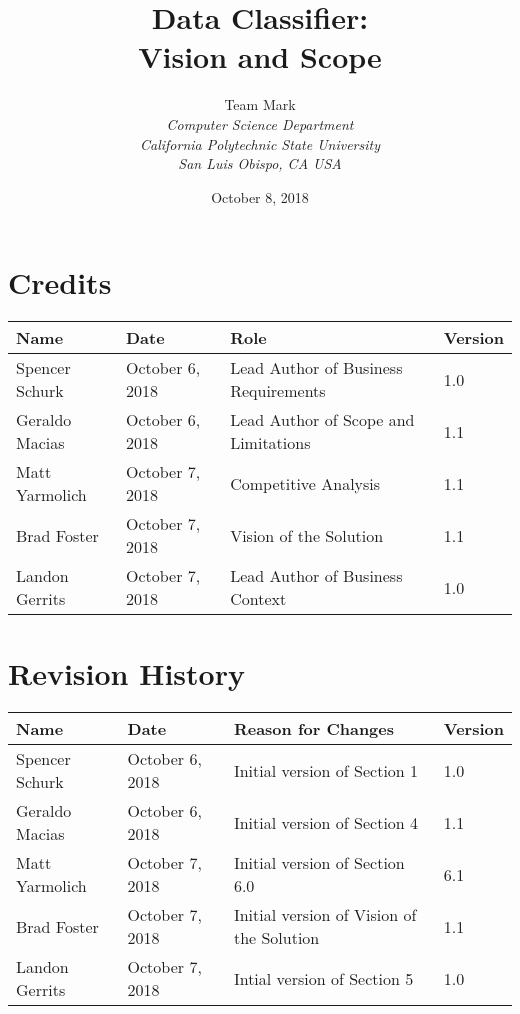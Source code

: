 \documentclass[12pt,oneside,letterpaper]{article}
\begin{document}
\title{\bfseries Data Classifier: \\Vision and Scope}

\author {
\large{Team Mark}\\
\emph{Computer Science Department}\\
\emph{California Polytechnic State University}\\
\emph{San Luis Obispo, CA USA}\\
}

\date{October 8, 2018}
\maketitle \thispagestyle{empty}

\pagebreak
\tableofcontents


\section*{Credits}
\begin{tabular}{|l|l|p{2in}|l|}
\hline
\textbf{Name}&\textbf{Date}&\textbf{Role}&\textbf{Version}\\
\hline
Spencer Schurk&October 6, 2018&Lead Author of Business Requirements&1.0\\
\hline
Geraldo Macias&October 6, 2018&Lead Author of Scope and Limitations&1.1\\
\hline
Matt Yarmolich&October 7, 2018&Competitive Analysis&1.1\\
\hline
Brad Foster&October 7, 2018&Vision of the Solution&1.1\\
\hline
Landon Gerrits&October 7, 2018& Lead Author of Business Context&1.0\\
\hline
\end{tabular}


\section*{Revision History}
\begin{tabular}{|l|l|p{2in}|l|}
\hline
\textbf{Name}&\textbf{Date}&\textbf{Reason for Changes}&\textbf{Version}\\
\hline
Spencer Schurk&October 6, 2018&Initial version of Section 1&1.0\\
\hline
Geraldo Macias&October 6, 2018&Initial version of Section 4&1.1\\
\hline
Matt Yarmolich&October 7, 2018&Initial version of Section 6.0&6.1\\
\hline
Brad Foster&October 7, 2018&Initial version of Vision of the Solution&1.1\\
\hline
Landon Gerrits&October 7, 2018&Intial version of Section 5&1.0\\
\hline
\end{tabular}
\end{document}
